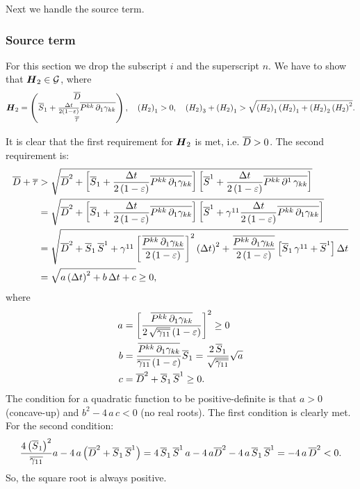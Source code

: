 \documentclass[10pt,preprint]{aastex}
\begin{document}
Next we handle the source term.

\subsubsection{Source term}
For this section we drop the subscript $i$ and the superscript $n$. We have to show that $\bH_{2}\in\cG$, where
\begin{equation}
    \bH_{2}=\begin{pmatrix}\ol{D}\\ \ol{S}_{1}+\f{\Delta t}{2\left(1-\ve\right)}\ol{P^{kk}\,\pd{\gamma_{kk}}{1}} \\ \ol{\tau}\end{pmatrix},\hspace{1em}\left(H_{2}\right)_{1}>0,\hspace{1em}\left(H_{2}\right)_{3}+\left(H_{2}\right)_{1}>\sqrt{\left(H_{2}\right)_{1}\left(H_{2}\right)_{1}+\left(H_{2}\right)_{2}\left(H_{2}\right)^{2}}.
\end{equation}

It is clear that the first requirement for $\bH_{2}$ is met, i.e. $\ol{D}>0$. The second requirement is:
\begin{align}
\ol{D}+\ol{\tau}&>\sqrt{\ol{D}^{2}+\left[\ol{S}_{1}+\f{\Delta t}{2\left(1-\ve\right)}\ol{P^{kk}\,\pd{\gamma_{kk}}{1}}\right] \left[\ol{S}^{1}+\f{\Delta t}{2\left(1-\ve\right)}\ol{P^{kk}\,\p^{1}\,\gamma_{kk}}\right] }\\
&=\sqrt{\ol{D}^{2}+\left[\ol{S}_{1}+\f{\Delta t}{2\left(1-\ve\right)}\ol{P^{kk}\,\pd{\gamma_{kk}}{1}}\right] \left[\ol{S}^{1}+\gamma^{11}\f{\Delta t}{2\left(1-\ve\right)}\ol{P^{kk}\,\pd{\gamma_{kk}}{1}}\right] }\\
&=\sqrt{\ol{D}^{2}+\ol{S}_{1}\,\ol{S}^{1}+\gamma^{11}\left[\f{\ol{P^{kk}\,\pd{\gamma_{kk}}{1}}}{2\left(1-\ve\right)}\right]^{2}\left(\Delta t\right)^{2}+\f{\ol{P^{kk}\,\pd{\gamma_{kk}}{1}}}{2\left(1-\ve\right)}\left[\ol{S}_{1}\,\gamma^{11}+\ol{S}^{1}\right]\Delta t}\\
&=\sqrt{a\left(\Delta t\right)^{2}+b\,\Delta t+c}\geq0,
\end{align}
where
\begin{align}
    a&=\left[\f{\ol{P^{kk}\,\pd{\gamma_{kk}}{1}}}{2\,\sqrt{\ol{\gamma_{11}}}\left(1-\ve\right)}\right]^{2}\geq0\\
    b&=\f{\ol{P^{kk}\,\pd{\gamma_{kk}}{1}}}{\ol{\gamma_{11}}\left(1-\ve\right)}\ol{S}_{1}=\f{2\,\ol{S}_{1}}{\sqrt{\ol{\gamma_{11}}}}\sqrt{a}\\
    c&=\ol{D}^{2}+\ol{S}_{1}\,\ol{S}^{1}\geq0.
\end{align}
The condition for a quadratic function to be positive-definite is that $a>0$ (concave-up) and $b^{2}-4\,a\,c<0$ (no real roots). The first condition is clearly met. For the second condition:
\begin{equation}
    \f{4\left(\ol{S}_{1}\right)^{2}}{\ol{\gamma_{11}}}a-4\,a\left(\ol{D}^{2}+\ol{S}_{1}\,\ol{S}^{1}\right)=4\,\ol{S}_{1}\,\ol{S}^{1}\,a-4\,a\ol{D}^{2}-4\,a\,\ol{S}_{1}\,\ol{S}^{1}=-4\,a\,\ol{D}^{2}<0.
\end{equation}
So, the square root is always positive.
\end{document}
